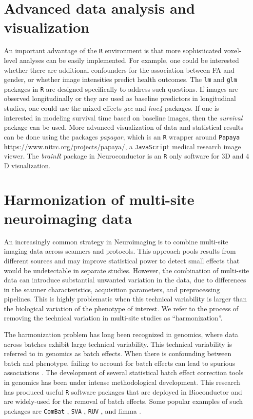 \documentclass[]{elsarticle} %
\newcommand{\code}[1]{\texttt{#1}}
\newcommand{\pkg}[1]{\emph{#1}}
\newcommand{\rlang}{\texttt{R}}
\begin{document}
\section{Advanced data analysis and visualization}
An important advantage  of the  {\rlang} environment  is that  more sophisticated voxel-level analyses can be easily implemented.  For  example, one could be interested  whether  there  are  additional confounders  for the association between FA and gender, or  whether  image intensities predict health outcomes. The \code{lm} and \code{glm} packages in {\rlang} are designed specifically to address such questions. If images are observed longitudinally or they are used as baseline predictors in longitudinal studies, one could use the mixed effects \pkg{gee} \cite{gee} and \pkg{lme4} \cite{lme4} packages. If one is interested in modeling survival time based on baseline images, then the \pkg{survival} package \citep{survival-package,survival-book} can be used. More advanced visualization of data and statistical results can be done using the packages \pkg{papayar}, which is an {\rlang} wrapper around \texttt{Papaya} \url{https://www.nitrc.org/projects/papaya/}, a \texttt{JavaScript} medical research image viewer. The \pkg{brainR} package in Neuroconductor is an {\rlang} only software for $3$D and $4$D visualization.

\section{Harmonization of multi-site neuroimaging data}\label{sec:datafusion}

An increasingly common strategy in Neuroimaging is to combine multi-site imaging data across scanners and protocols. This approach pools results from different sources and may improve statistical power to detect small effects  that would be undetectable in separate studies. However, the combination of multi-site data can introduce substantial unwanted variation in the data, due to differences in the scanner characteristics,  acquisition parameters, and preprocessing pipelines. This is highly problematic when this technical variability is larger than the biological variation of the phenotype of interest. We refer to the process of removing the technical variation in multi-site studies as ``harmonization''. 

The harmonization problem has long been recognized in genomics, where data across batches exhibit large technical variability. This technical variability is referred to in genomics as batch effects. When there is confounding between batch and phenotype, failing to account for batch effects can lead to spurious associations \citep{batchreview}. The development of several statistical batch effect correction tools in genomics has been under intense methodological development. This research has produced useful {\rlang} software packages that are deployed in Bioconductor and  are widely-used for the removal of batch effects. Some popular examples of such packages are  \texttt{ComBat} \citep{combat}, \texttt{SVA} \citep{sva1,sva2}, \texttt{RUV} \citep{ruv}, and limma \citep{limma1,limma2}. 
\end{document}
